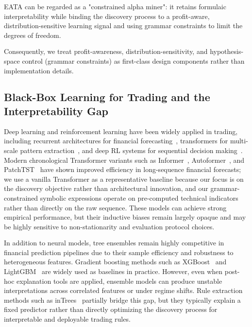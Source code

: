 EATA can be regarded as a "constrained alpha miner": it retains formulaic interpretability while binding the discovery process to a profit-aware, distribution-sensitive learning signal and using grammar constraints to limit the degrees of freedom.

Consequently, we treat profit-awareness, distribution-sensitivity, and hypothesis-space control (grammar constraints) as first-class design components rather than implementation details.

\subsection{Black-Box Learning for Trading and the Interpretability Gap}

Deep learning and reinforcement learning have been widely applied in trading, including recurrent architectures for financial forecasting~\cite{fischer2018deep}, transformers for multi-scale pattern extraction~\cite{ding2020hierarchical,vaswani2017attention}, and deep RL systems for sequential decision making~\cite{deng2016deep,liu2020finrl}. Modern chronological Transformer variants such as Informer~\cite{zhou2021informer}, Autoformer~\cite{wu2021autoformer}, and PatchTST~\cite{nie2023patchtst} have shown improved efficiency in long-sequence financial forecasts; we use a vanilla Transformer as a representative baseline because our focus is on the discovery objective rather than architectural innovation, and our grammar-constrained symbolic expressions operate on pre-computed technical indicators rather than directly on the raw sequence. These models can achieve strong empirical performance, but their inductive biases remain largely opaque and may be highly sensitive to non-stationarity and evaluation protocol choices.

In addition to neural models, tree ensembles remain highly competitive in financial prediction pipelines due to their sample efficiency and robustness to heterogeneous features. Gradient boosting methods such as XGBoost~\cite{chen2016xgboost} and LightGBM~\cite{ke2017lightgbm} are widely used as baselines in practice. However, even when post-hoc explanation tools are applied, ensemble models can produce unstable interpretations across correlated features or under regime shifts. Rule extraction methods such as inTrees~\cite{deng2019interpreting} partially bridge this gap, but they typically explain a fixed predictor rather than directly optimizing the discovery process for interpretable and deployable trading rules. 

